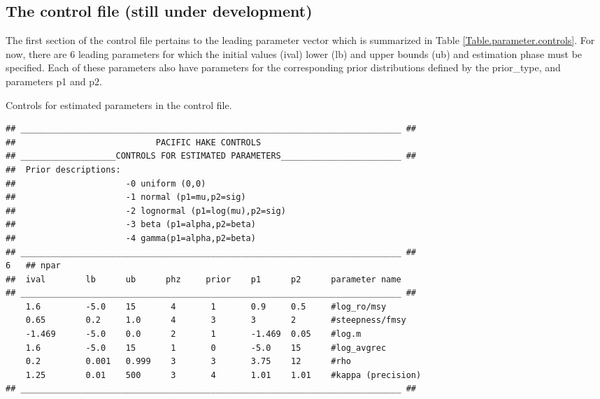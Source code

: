 



\begin{multicols}{2}
\subsection{The control file (still under development)}
The first section of the control file pertains to the leading parameter vector which is summarized in Table \ref{Table.parameter.controls}.  For now, there are 6 leading parameters for which the initial values (ival) lower (lb) and upper bounds (ub) and estimation phase must be specified.  Each of these parameters also have parameters for the corresponding prior distributions defined by the prior\_type, and parameters p1 and p2.

\begin{tablehere}\caption{Controls for estimated parameters in the control file.}\label{Table.parameter.controls}
\begin{tiny}
\begin{verbatim}
## ____________________________________________________________________________ ##
##                            PACIFIC HAKE CONTROLS
## ___________________CONTROLS FOR ESTIMATED PARAMETERS________________________ ##
##  Prior descriptions:
##                      -0 uniform (0,0)
##                      -1 normal (p1=mu,p2=sig)
##                      -2 lognormal (p1=log(mu),p2=sig)
##                      -3 beta (p1=alpha,p2=beta)
##                      -4 gamma(p1=alpha,p2=beta)
## ____________________________________________________________________________ ##
6   ## npar
##  ival        lb      ub      phz     prior    p1      p2      parameter name
## ____________________________________________________________________________ ##
    1.6         -5.0    15       4       1       0.9     0.5     #log_ro/msy 
    0.65        0.2     1.0      4       3       3       2       #steepness/fmsy
    -1.469      -5.0    0.0      2       1       -1.469  0.05    #log.m
    1.6         -5.0    15       1       0       -5.0    15      #log_avgrec
    0.2         0.001   0.999    3       3       3.75    12      #rho
    1.25        0.01    500      3       4       1.01    1.01    #kappa (precision)
## ____________________________________________________________________________ ##
\end{verbatim}
\end{tiny}
\end{tablehere}

\end{multicols}
